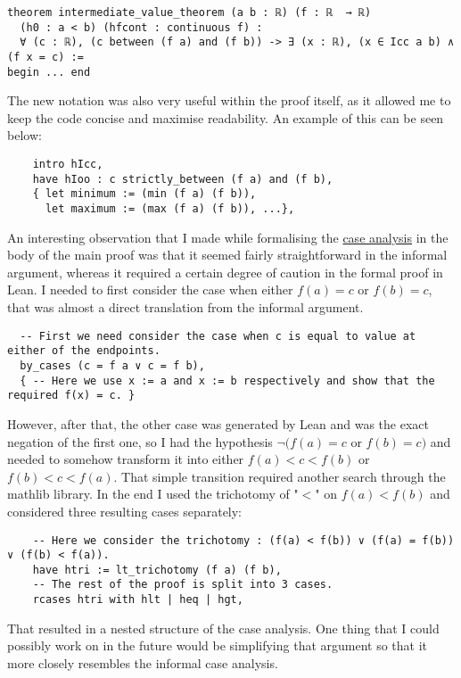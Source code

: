 \documentclass[11pt]{article}
\begin{document}
\begin{verbatim}
theorem intermediate_value_theorem (a b : ℝ) (f : ℝ  → ℝ)
  (h0 : a < b) (hfcont : continuous f) :
  ∀ (c : ℝ), (c between (f a) and (f b)) -> ∃ (x : ℝ), (x ∈ Icc a b) ∧ (f x = c) :=
begin ... end
\end{verbatim}
The new notation was also very useful within the proof itself, as it allowed me
to keep the code concise and maximise readability. An example of this can be seen
below:

\begin{verbatim}
    intro hIcc,
    have hIoo : c strictly_between (f a) and (f b),
    { let minimum := (min (f a) (f b)),
      let maximum := (max (f a) (f b)), ...},
\end{verbatim}
An interesting observation that I made while formalising the \hyperlink{general_cases}{case analysis} in the
body of the main proof was that it seemed fairly straightforward in the informal
argument, whereas it required a certain degree of caution in the formal proof in Lean.
I needed to first consider the case when either $f(a) = c$ or $f(b) = c$, that
was almost a direct translation from the informal argument.
\begin{verbatim}
  -- First we need consider the case when c is equal to value at either of the endpoints.
  by_cases (c = f a ∨ c = f b),
  { -- Here we use x := a and x := b respectively and show that the required f(x) = c. }
\end{verbatim}
However, after that, the other case was generated by Lean and was the exact
negation of the first one, so I had the hypothesis $\neg(f(a) = c$ or $f(b) = c)$
and needed to somehow transform it into either $f(a) < c < f(b)$ or $f(b) < c
< f(a)$. That simple transition required another search through the mathlib
library. In the end I used the trichotomy of "$<$" on $f(a) < f(b)$ and
considered three resulting cases separately:

\begin{verbatim}
    -- Here we consider the trichotomy : (f(a) < f(b)) ∨ (f(a) = f(b)) ∨ (f(b) < f(a)).
    have htri := lt_trichotomy (f a) (f b),
    -- The rest of the proof is split into 3 cases.
    rcases htri with hlt | heq | hgt,
\end{verbatim}
That resulted in a nested structure of the case analysis. One thing that I
could possibly work on in the future would be simplifying that argument so that
it more closely resembles the informal case analysis.
\end{document}
